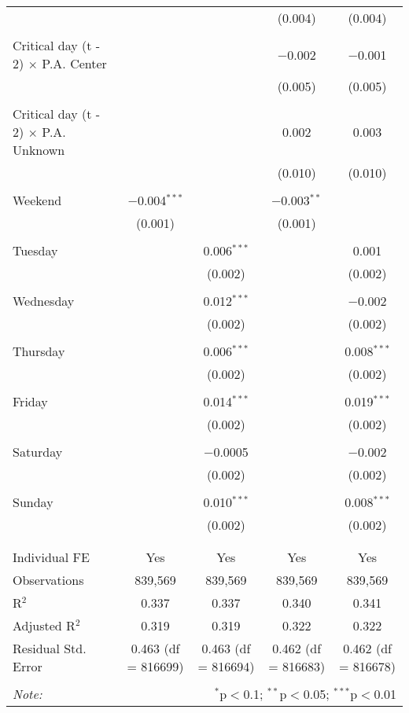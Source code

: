 \documentclass[
]{article}
\begin{document}
\begin{table}[!htbp]
{\begin{tabular}{@{\extracolsep{5pt}}lcccc}
  &  &  & (0.004) & (0.004) \\ 
  & & & & \\ 
 Critical day (t - 2) $\times$ P.A. Center &  &  & $-$0.002 & $-$0.001 \\ 
  &  &  & (0.005) & (0.005) \\ 
  & & & & \\ 
 Critical day (t - 2) $\times$ P.A. Unknown &  &  & 0.002 & 0.003 \\ 
  &  &  & (0.010) & (0.010) \\ 
  & & & & \\ 
 Weekend & $-$0.004$^{***}$ &  & $-$0.003$^{**}$ &  \\ 
  & (0.001) &  & (0.001) &  \\ 
  & & & & \\ 
 Tuesday &  & 0.006$^{***}$ &  & 0.001 \\ 
  &  & (0.002) &  & (0.002) \\ 
  & & & & \\ 
 Wednesday &  & 0.012$^{***}$ &  & $-$0.002 \\ 
  &  & (0.002) &  & (0.002) \\ 
  & & & & \\ 
 Thursday &  & 0.006$^{***}$ &  & 0.008$^{***}$ \\ 
  &  & (0.002) &  & (0.002) \\ 
  & & & & \\ 
 Friday &  & 0.014$^{***}$ &  & 0.019$^{***}$ \\ 
  &  & (0.002) &  & (0.002) \\ 
  & & & & \\ 
 Saturday &  & $-$0.0005 &  & $-$0.002 \\ 
  &  & (0.002) &  & (0.002) \\ 
  & & & & \\ 
 Sunday &  & 0.010$^{***}$ &  & 0.008$^{***}$ \\ 
  &  & (0.002) &  & (0.002) \\ 
  & & & & \\ 
\hline \\[-1.8ex] 
Individual FE & Yes & Yes & Yes & Yes \\ 
Observations & 839,569 & 839,569 & 839,569 & 839,569 \\ 
R$^{2}$ & 0.337 & 0.337 & 0.340 & 0.341 \\ 
Adjusted R$^{2}$ & 0.319 & 0.319 & 0.322 & 0.322 \\ 
Residual Std. Error & 0.463 (df = 816699) & 0.463 (df = 816694) & 0.462 (df = 816683) & 0.462 (df = 816678) \\ 
\hline 
\hline \\[-1.8ex] 
\textit{Note:}  & \multicolumn{4}{r}{$^{*}$p$<$0.1; $^{**}$p$<$0.05; $^{***}$p$<$0.01} \\ 
\end{tabular}
} 
\end{table} 
\newpage
\end{document}
